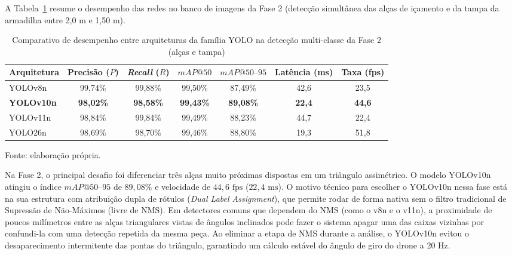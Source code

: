 A Tabela~\ref{tab:comparativo_yolo_fase2_resultados} resume o desempenho das redes no banco de imagens da Fase 2 (detecção simultânea das alças de içamento e da tampa da armadilha entre 2,0 m e 1,50 m).

\begin{table}[H]
	\centering
	\footnotesize
	\setlength{\tabcolsep}{3.5pt}
	\captionsetup{justification=centering}
	\caption{Comparativo de desempenho entre arquiteturas da família YOLO na detecção multi-classe da Fase 2 (alças e tampa)}
	\label{tab:comparativo_yolo_fase2_resultados}
	\vspace{0.2cm}
	\begin{tabular}{lcccccc}
		\hline
		\textbf{Arquitetura} & \textbf{Precisão ($P$)} & \textbf{\textit{Recall} ($R$)} & \textbf{$mAP@50$} & \textbf{$mAP@50\text{--}95$} & \textbf{Latência (ms)} & \textbf{Taxa (fps)} \\
		\hline
		YOLOv8n    & 99,74\%      & 99,88\%    & 99,50\%    & 87,49\%         & 42,6           & 23,5 \\
		\textbf{YOLOv10n} & \textbf{98,02\%} & \textbf{98,58\%} & \textbf{99,43\%} & \textbf{89,08\%} & \textbf{22,4} & \textbf{44,6} \\
		YOLOv11n   & 98,84\%      & 99,84\%    & 99,49\%    & 88,23\%         & 44,7           & 22,4 \\
		YOLO26n    & 98,69\%      & 98,70\%    & 99,46\%    & 88,80\%         & 19,3           & 51,8 \\
		\hline
	\end{tabular}
	\vspace{0.2cm}
	\begin{flushleft}
		\footnotesize Fonte: elaboração própria.
	\end{flushleft}
\end{table}

Na Fase 2, o principal desafio foi diferenciar três alças muito próximas dispostas em um triângulo assimétrico. O modelo YOLOv10n atingiu o índice $mAP@50\text{--}95$ de $89{,}08\%$ e velocidade de $44{,}6\text{ fps}$ ($22{,}4\text{ ms}$). O motivo técnico para escolher o YOLOv10n nessa fase está na sua estrutura com atribuição dupla de rótulos (\textit{Dual Label Assignment}), que permite rodar de forma nativa sem o filtro tradicional de Supressão de Não-Máximos (livre de NMS). Em detectores comuns que dependem do NMS (como o v8n e o v11n), a proximidade de poucos milímetros entre as alças triangulares vistas de ângulos inclinados pode fazer o sistema apagar uma das caixas vizinhas por confundi-la com uma detecção repetida da mesma peça. Ao eliminar a etapa de NMS durante a análise, o YOLOv10n evitou o desaparecimento intermitente das pontas do triângulo, garantindo um cálculo estável do ângulo de giro do drone a 20 Hz.

